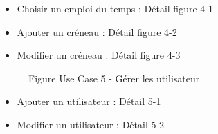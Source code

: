 \documentclass[a4paper, 11pt]{article}
\begin{document}
        \begin{itemize}
        \item Choisir un emploi du temps : Détail figure 4-1
        \item Ajouter un créneau : Détail figure 4-2
        \item Modifier un créneau : Détail figure 4-3
        \end{itemize}
	\begin{figure}[h]
        \caption{Figure Use Case 5 - Gérer les utilisateur}
        \label{fig-diag-use-case-5}
        \end{figure}
        \begin{itemize}
        \item Ajouter un utilisateur : Détail 5-1
        \item Modifier un utilisateur : Détail 5-2
        \end{itemize}
        \clearpage
	\clearpage
\end{document}
